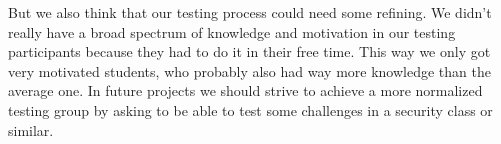 But we also think that our testing process could need some refining. We didn't really have a broad spectrum of knowledge and motivation in our testing participants because they had to do it in their free time. This way we only got very motivated students, who probably also had way more knowledge than the average one. In future projects we should strive to achieve a more normalized testing group by asking to be able to test some challenges in a security class or similar.
